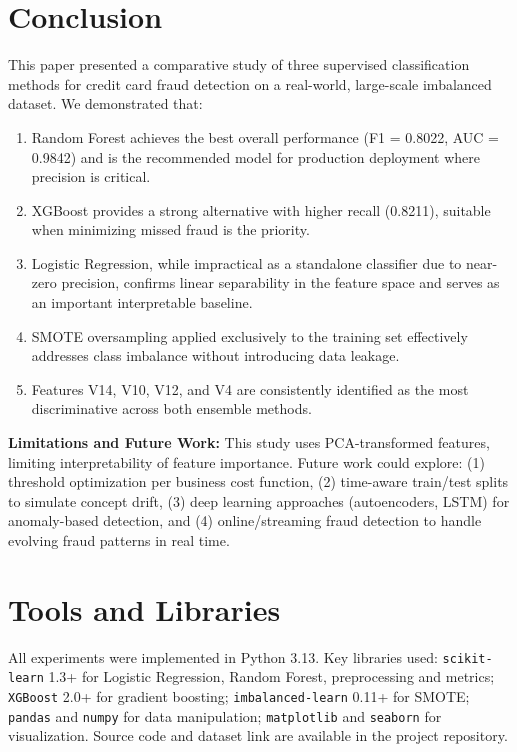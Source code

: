 \documentclass[conference]{IEEEtran}
\begin{document}
\section{Conclusion}
\label{sec:conclusion}

This paper presented a comparative study of three supervised classification methods for credit card fraud detection on a real-world, large-scale imbalanced dataset. We demonstrated that:

\begin{enumerate}
    \item Random Forest achieves the best overall performance (F1 = 0.8022, AUC = 0.9842) and is the recommended model for production deployment where precision is critical.
    \item XGBoost provides a strong alternative with higher recall (0.8211), suitable when minimizing missed fraud is the priority.
    \item Logistic Regression, while impractical as a standalone classifier due to near-zero precision, confirms linear separability in the feature space and serves as an important interpretable baseline.
    \item SMOTE oversampling applied exclusively to the training set effectively addresses class imbalance without introducing data leakage.
    \item Features V14, V10, V12, and V4 are consistently identified as the most discriminative across both ensemble methods.
\end{enumerate}

\textbf{Limitations and Future Work:} This study uses PCA-transformed features, limiting interpretability of feature importance. Future work could explore: (1) threshold optimization per business cost function, (2) time-aware train/test splits to simulate concept drift, (3) deep learning approaches (autoencoders, LSTM) for anomaly-based detection, and (4) online/streaming fraud detection to handle evolving fraud patterns in real time.

\section*{Tools and Libraries}

All experiments were implemented in Python 3.13. Key libraries used: \texttt{scikit-learn} 1.3+ for Logistic Regression, Random Forest, preprocessing and metrics; \texttt{XGBoost} 2.0+ for gradient boosting; \texttt{imbalanced-learn} 0.11+ for SMOTE; \texttt{pandas} and \texttt{numpy} for data manipulation; \texttt{matplotlib} and \texttt{seaborn} for visualization. Source code and dataset link are available in the project repository.
\end{document}
